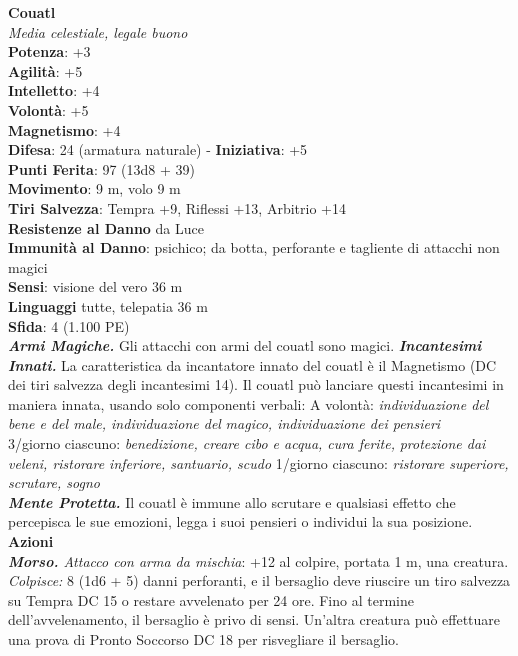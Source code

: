 \begin{multicols}{2}
\medskip\textbf{Couatl}\\
\emph{Media celestiale, legale buono}\\
\textbf{Potenza}: +3\\
\textbf{Agilità}: +5\\
\textbf{Intelletto}: +4\\
\textbf{Volontà}: +5\\
\textbf{Magnetismo}: +4\\
\textbf{Difesa}: 24 (armatura naturale) - \textbf{Iniziativa}: +5\\
\textbf{Punti Ferita}: 97 (13d8 + 39)\\
\textbf{Movimento}: 9 m, volo 9 m\\
\textbf{Tiri Salvezza}: Tempra +9, Riflessi +13, Arbitrio +14\\
\textbf{Resistenze al Danno} da Luce\\
\textbf{Immunità al Danno}: psichico; da botta, perforante e tagliente di attacchi non magici\\
\textbf{Sensi}: visione del vero 36 m\\
\textbf{Linguaggi} tutte, telepatia 36 m \\
\textbf{Sfida}: 4 (1.100 PE)\smallskip\\
\emph{\textbf{Armi Magiche.}} Gli attacchi con armi del couatl sono magici.
\emph{\textbf{Incantesimi Innati.}} La caratteristica da incantatore innato del couatl è il Magnetismo (DC dei tiri salvezza degli incantesimi 14). Il couatl può lanciare questi incantesimi in maniera innata, usando solo componenti verbali:
A volontà: \emph{individuazione del bene e del male, individuazione del} \emph{magico, individuazione dei pensieri}\\
3/giorno ciascuno: \emph{benedizione, creare cibo e acqua, cura ferite,} \emph{protezione dai veleni, ristorare inferiore, santuario, scudo} 1/giorno ciascuno: \emph{ristorare superiore, scrutare, sogno}\\
\emph{\textbf{Mente Protetta.}} Il couatl è immune allo scrutare e qualsiasi effetto che percepisca le sue emozioni, legga i suoi pensieri o individui la sua posizione.\\
\smallskip\textbf{Azioni}\\
\emph{\textbf{Morso.} Attacco con arma da mischia}: +12 al colpire, portata 1 m, una creatura.\\
\emph{Colpisce:} 8 (1d6 + 5) danni perforanti, e il bersaglio deve riuscire un tiro salvezza su Tempra DC  15 o restare avvelenato per 24 ore. Fino al termine dell'avvelenamento, il bersaglio è privo di sensi. Un'altra creatura può effettuare una prova di Pronto Soccorso DC  18 per risvegliare il bersaglio.\\

\end{multicols}
